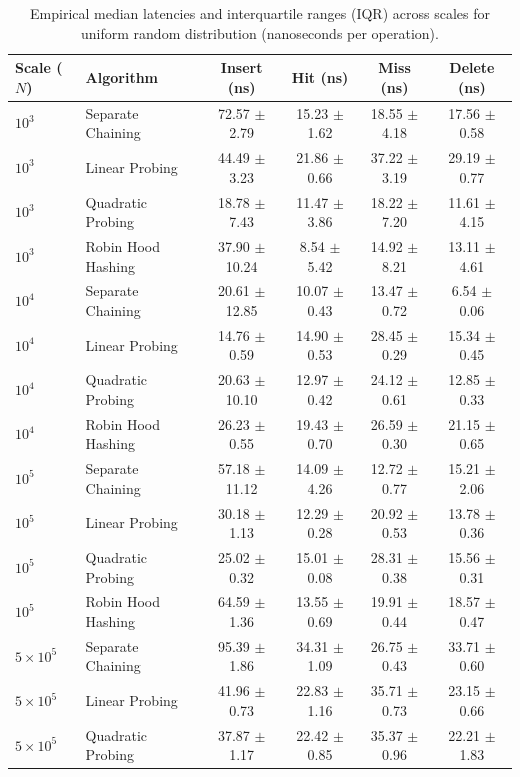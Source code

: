 \documentclass[conference]{IEEEtran}
\begin{document}
\begin{table}[t]
\centering
\caption{Empirical median latencies and interquartile ranges (IQR) across scales for uniform random distribution (nanoseconds per operation).}
\label{tbl:latency_scaling}
\begin{tabular}{llcccc}
\toprule
\textbf{Scale ($N$)} & \textbf{Algorithm} & \textbf{Insert (ns)} & \textbf{Hit (ns)} & \textbf{Miss (ns)} & \textbf{Delete (ns)} \\
\midrule
$10^3$ & Separate Chaining & 72.57 $\pm$ 2.79 & 15.23 $\pm$ 1.62 & 18.55 $\pm$ 4.18 & 17.56 $\pm$ 0.58 \\
$10^3$ & Linear Probing & 44.49 $\pm$ 3.23 & 21.86 $\pm$ 0.66 & 37.22 $\pm$ 3.19 & 29.19 $\pm$ 0.77 \\
$10^3$ & Quadratic Probing & 18.78 $\pm$ 7.43 & 11.47 $\pm$ 3.86 & 18.22 $\pm$ 7.20 & 11.61 $\pm$ 4.15 \\
$10^3$ & Robin Hood Hashing & 37.90 $\pm$ 10.24 & 8.54 $\pm$ 5.42 & 14.92 $\pm$ 8.21 & 13.11 $\pm$ 4.61 \\
\midrule
$10^4$ & Separate Chaining & 20.61 $\pm$ 12.85 & 10.07 $\pm$ 0.43 & 13.47 $\pm$ 0.72 & 6.54 $\pm$ 0.06 \\
$10^4$ & Linear Probing & 14.76 $\pm$ 0.59 & 14.90 $\pm$ 0.53 & 28.45 $\pm$ 0.29 & 15.34 $\pm$ 0.45 \\
$10^4$ & Quadratic Probing & 20.63 $\pm$ 10.10 & 12.97 $\pm$ 0.42 & 24.12 $\pm$ 0.61 & 12.85 $\pm$ 0.33 \\
$10^4$ & Robin Hood Hashing & 26.23 $\pm$ 0.55 & 19.43 $\pm$ 0.70 & 26.59 $\pm$ 0.30 & 21.15 $\pm$ 0.65 \\
\midrule
$10^5$ & Separate Chaining & 57.18 $\pm$ 11.12 & 14.09 $\pm$ 4.26 & 12.72 $\pm$ 0.77 & 15.21 $\pm$ 2.06 \\
$10^5$ & Linear Probing & 30.18 $\pm$ 1.13 & 12.29 $\pm$ 0.28 & 20.92 $\pm$ 0.53 & 13.78 $\pm$ 0.36 \\
$10^5$ & Quadratic Probing & 25.02 $\pm$ 0.32 & 15.01 $\pm$ 0.08 & 28.31 $\pm$ 0.38 & 15.56 $\pm$ 0.31 \\
$10^5$ & Robin Hood Hashing & 64.59 $\pm$ 1.36 & 13.55 $\pm$ 0.69 & 19.91 $\pm$ 0.44 & 18.57 $\pm$ 0.47 \\
\midrule
$5 \times 10^5$ & Separate Chaining & 95.39 $\pm$ 1.86 & 34.31 $\pm$ 1.09 & 26.75 $\pm$ 0.43 & 33.71 $\pm$ 0.60 \\
$5 \times 10^5$ & Linear Probing & 41.96 $\pm$ 0.73 & 22.83 $\pm$ 1.16 & 35.71 $\pm$ 0.73 & 23.15 $\pm$ 0.66 \\
$5 \times 10^5$ & Quadratic Probing & 37.87 $\pm$ 1.17 & 22.42 $\pm$ 0.85 & 35.37 $\pm$ 0.96 & 22.21 $\pm$ 1.83 \\

\end{tabular}
\end{table}
\end{document}
